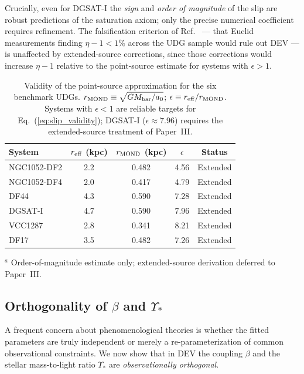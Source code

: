 \documentclass[aps,prd,reprint,floatfix,nofootinbib,superscriptaddress]{revtex4-2}
\newcommand{\aO}{a_0}
\begin{document}
Crucially, even for DGSAT-I the \emph{sign} and \emph{order of
magnitude} of the slip are robust predictions of the saturation
axiom; only the precise numerical coefficient requires refinement.
The falsification criterion of Ref.~\cite{Mendes2026} — that
Euclid measurements finding $\eta - 1 < 1\%$ across the UDG sample
would rule out DEV — is unaffected by extended-source corrections,
since those corrections would increase $\eta - 1$ relative to the
point-source estimate for systems with $\epsilon > 1$.

\begin{table}[h]
\caption{Validity of the point-source approximation for the six
benchmark UDGs. $r_{\rm MOND} \equiv \sqrt{GM_{\rm bar}/\aO}$;
$\epsilon \equiv r_{\rm eff}/r_{\rm MOND}$. Systems with
$\epsilon < 1$ are reliable targets for Eq.~(\ref{eq:slip_validity});
DGSAT-I ($\epsilon \approx 7.96$) requires the extended-source
treatment of Paper~III.}
\label{tab:validity}
\begin{ruledtabular}
\begin{tabular}{lcccc}
System & $r_{\rm eff}$ (kpc) & $r_{\rm MOND}$ (kpc)
       & $\epsilon$ & Status \\
\hline
NGC1052-DF2 & 2.2 & 0.482 & 4.56 & Extended \\
NGC1052-DF4 & 2.0 & 0.417 & 4.79 & Extended \\
DF44        & 4.3 & 0.590 & 7.28 & Extended \\
DGSAT-I     & 4.7 & 0.590 & 7.96 & Extended \\
VCC1287     & 2.8 & 0.341 & 8.21 & Extended \\
DF17        & 3.5 & 0.482 & 7.26 & Extended \\
\end{tabular}
\end{ruledtabular}
{\small $^a$ Order-of-magnitude estimate only; extended-source
derivation deferred to Paper~III.}
\end{table}

\subsection{Orthogonality of \texorpdfstring{$\beta$ and $\Upsilon_*$}{beta and Upsilon}}

A frequent concern about phenomenological theories is whether the
fitted parameters are truly independent or merely a re-parameterization
of common observational constraints. We now show that in DEV the
coupling $\beta$ and the stellar mass-to-light ratio $\Upsilon_*$ are
\emph{observationally orthogonal}.
\end{document}
